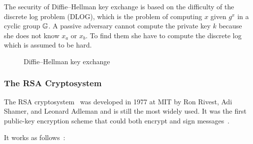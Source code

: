 The security of Diffie–Hellman key exchange is based on the difficulty of the discrete log problem (DLOG), which is the problem of computing $x$ given $g^{x}$ in a cyclic group $\mathbb{G}$. A passive adversary cannot compute the private key $k$ because she does not know $x_a$ or $x_b$. To find them she have to compute the discrete log which is assumed to be hard.

\begin{figure}[!hb]
  \centering
  \caption{Diffie–Hellman key exchange}
  \label{fig:crypto:dh}
\end{figure}

\subsubsection{The RSA Cryptosystem}
\label{preliminaries:crypto_block:pub:rsa}

The RSA cryptosystem~\cite{rsa} was developed in 1977 at MIT by Ron Rivest, Adi Shamer, and Leonard Adleman and is still the most widely used. It was the first public-key encryption scheme that could both encrypt and sign messages~\cite{kiagias:crypto}.

It works as follows~\cite{Katz:2014:IMC:2700550, kiagias:crypto}:

